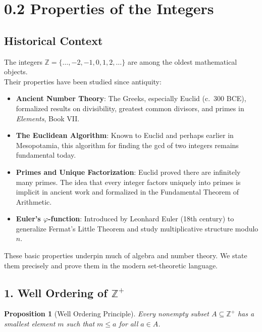 \documentclass[12pt]{article}
\newtheorem{proposition}[theorem]{Proposition}
\theoremstyle{definition}
\begin{document}
\section*{0.2 Properties of the Integers}

\subsection*{Historical Context}


The integers $\mathbb{Z} = \{\dots,-2,-1,0,1,2,\dots\}$ are among the oldest mathematical objects. \\

\noindent
Their properties have been studied since antiquity:

\begin{itemize}
    \item \textbf{Ancient Number Theory}: The Greeks, especially Euclid (c.\ 300 BCE), formalized results on divisibility, greatest common divisors, and primes in \emph{Elements}, Book VII.
    \item \textbf{The Euclidean Algorithm}: Known to Euclid and perhaps earlier in Mesopotamia, this algorithm for finding the gcd of two integers remains fundamental today.
    \item \textbf{Primes and Unique Factorization}: Euclid proved there are infinitely many primes. The idea that every integer factors uniquely into primes is implicit in ancient work and formalized in the Fundamental Theorem of Arithmetic.
    \item \textbf{Euler's $\varphi$-function}: Introduced by Leonhard Euler (18th century) to generalize Fermat's Little Theorem and study multiplicative structure modulo $n$.
\end{itemize}

\noindent
These basic properties underpin much of algebra and number theory. We state them precisely and prove them in the modern set-theoretic language.

\newpage

\subsection*{1. Well Ordering of $\mathbb{Z}^+$}


\begin{proposition}[Well Ordering Principle]
Every nonempty subset $A \subseteq \mathbb{Z}^+$ has a smallest element $m$ such that $m \le a$ for all $a \in A$.
\end{proposition}
\end{document}
